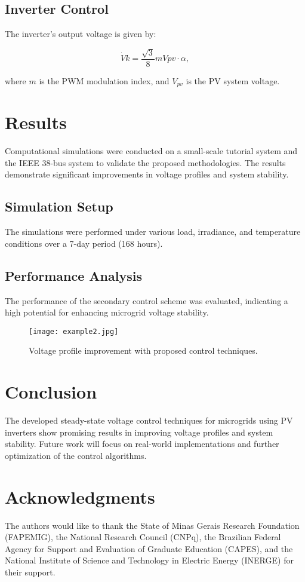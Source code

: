 \documentclass[journal]{IEEEtran}
\begin{document}
	\subsection{Inverter Control}
	The inverter's output voltage is given by:
	
	\begin{equation}
		\dot{V}k = \frac{\sqrt{3}}{8} m V{pv} \cdot \alpha,
	\end{equation}
	
	where \(m\) is the PWM modulation index, and \(V_{pv}\) is the PV system voltage.
	
	\section{Results}
	Computational simulations were conducted on a small-scale tutorial system and the IEEE 38-bus system to validate the proposed methodologies. The results demonstrate significant improvements in voltage profiles and system stability.
	
	\subsection{Simulation Setup}
	The simulations were performed under various load, irradiance, and temperature conditions over a 7-day period (168 hours).
	
	\subsection{Performance Analysis}
	The performance of the secondary control scheme was evaluated, indicating a high potential for enhancing microgrid voltage stability.
	
	
	\begin{figure}[!t]
		\centering
		\texttt{[image: example2.jpg]}
		\caption{Voltage profile improvement with proposed control techniques.}
		\label{fig:voltage_profile}
	\end{figure}
	
	\section{Conclusion}
	The developed steady-state voltage control techniques for microgrids using PV inverters show promising results in improving voltage profiles and system stability. Future work will focus on real-world implementations and further optimization of the control algorithms.
	
	\section*{Acknowledgments}
	The authors would like to thank the State of Minas Gerais Research Foundation (FAPEMIG), the National Research Council (CNPq), the Brazilian Federal Agency for Support and Evaluation of Graduate Education (CAPES), and the National Institute of Science and Technology in Electric Energy (INERGE) for their support.
	\cite{xyz}
	  
	
    
\end{document}
